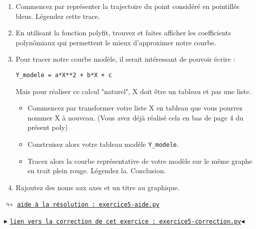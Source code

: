 \documentclass[11pt]{article}
\begin{document}
\begin{enumerate}
\item Commencez par représenter la trajectoire du point considéré en pointillés bleus. Légendez cette trace.
\item En utilisant la fonction polyfit, trouvez et faites afficher les coefficients polynômiaux qui permettent le mieux d'approximer notre courbe.
\item Pour tracer notre courbe modèle, il serait intéressant de pouvoir écrire : 

\begin{center}
\texttt{Y\_modele = a*X**2 + b*X + c}                                     \end{center}
Mais pour réaliser ce calcul "naturel", X doit être un tableau et pas une liste. 

\begin{itemize}
 \item Commencez par transformer votre liste X en tableau que vous pourrez nommer X à nouveau. (Vous avez déjà réalisé cela en bas de page 4 du présent poly)
 \item Construisez alors votre tableau modèle \texttt{Y\_modele}.
 \item Tracez alors la courbe représentative de votre modèle sur le même graphe en trait plein rouge. Légendez la. Conclusion.
\end{itemize}
 \item Rajoutez des noms aux axes et un titre au graphique.



\end{enumerate}
 
 
 
 
 


\begin{center}
 $\looparrowright$ \href{https://github.com/formationPythonPC-Juin/aides-formation/blob/master/exercice5-aide.py}{\underline{\texttt{aide à la résolution : exercice5-aide.py}}}
\end{center}



\begin{center}
$\blacktriangleright$ \href{https://github.com/formationPythonPC-Juin/corrections-formation/blob/master/exercice5-correction.py}{\underline{\texttt{lien vers la correction de cet exercice : exercice5-correction.py}}}$\blacktriangleleft$                                                                                                                                                                    \end{center}

 
 
 
 
 
 
 
 
 
 
 
 
 
 
 
 
 
 
 
 
 
\end{document}
